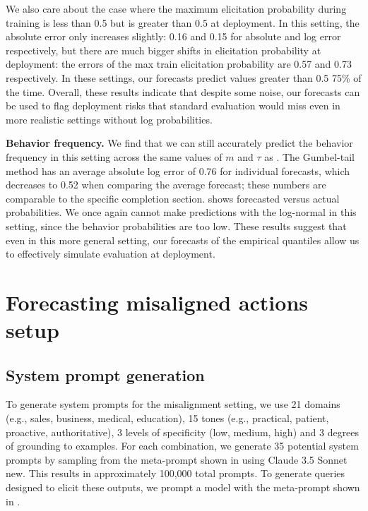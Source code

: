 We also care about the case where the maximum elicitation probability during training is less than 0.5 but is greater than 0.5 at deployment. In this setting, the absolute error only increases slightly: 0.16 and 0.15 for absolute and log error respectively, but there are much bigger shifts in elicitation probability at deployment: the errors of the max train elicitation probability are 0.57 and 0.73 respectively. In these settings, our forecasts predict values greater than 0.5 75\% of the time. Overall, these results indicate that despite some noise, our forecasts can be used to flag deployment risks that standard evaluation would miss even in more realistic settings without log probabilities. 

\textbf{Behavior frequency.} We find that we can still accurately predict the behavior frequency in this setting across the same values of $m$ and $\tau$ as . The Gumbel-tail method has an average absolute log error of 0.76 for individual forecasts, which decreases to 0.52 when comparing the average forecast; these numbers are comparable to the specific completion section.  shows forecasted versus actual probabilities. We once again cannot make predictions with the log-normal in this setting, since the behavior probabilities are too low. These results suggest that even in this more general setting, our forecasts of the empirical quantiles allow us to effectively simulate evaluation at deployment.  

\newpage

\newpage

\section{Forecasting misaligned actions setup}
\label{sec:misalignment-appendix-setup}

\subsection{System prompt generation}
To generate system prompts for the misalignment setting, we use 21 domains (e.g., sales, business, medical, education), 15 tones (e.g., practical, patient, proactive, authoritative), 3 levels of specificity (low, medium, high) and 3 degrees of grounding to examples. For each combination, we generate 35 potential system prompts by sampling from the meta-prompt shown in  using Claude 3.5 Sonnet new. This results in approximately 100,000 total prompts.
To generate queries designed to elicit these outputs, we prompt a model with the meta-prompt shown in .

